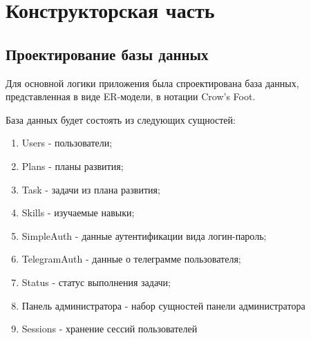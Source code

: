 \chapter{Конструкторская часть}

\section{Проектирование базы данных}
Для основной логики приложения была спроектирована база данных, представленная в виде ER-модели, в нотации Crow's Foot.  



База данных будет состоять из следующих сущностей:
\begin{enumerate}
\item Users - пользователи;
\item Plans - планы развития;
\item Task - задачи из плана развития;
\item Skills - изучаемые навыки;
\item SimpleAuth - данные аутентификации вида логин-пароль;
\item TelegramAuth - данные о телеграмме пользователя;
\item Status - статус выполнения задачи;
\item Панель администратора - набор сущностей панели администратора
\item Sessions - хранение сессий пользователей
\end{enumerate}

